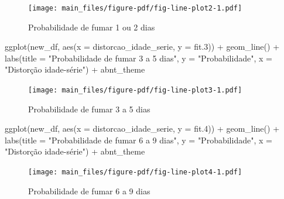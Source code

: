 \documentclass[
]{article}
\newenvironment{Shaded}{\begin{snugshade}}{\end{snugshade}}
\newcommand{\AttributeTok}[1]{\textcolor[rgb]{0.40,0.45,0.13}{#1}}
\newcommand{\FloatTok}[1]{\textcolor[rgb]{0.68,0.00,0.00}{#1}}
\newcommand{\FunctionTok}[1]{\textcolor[rgb]{0.28,0.35,0.67}{#1}}
\newcommand{\NormalTok}[1]{\textcolor[rgb]{0.00,0.23,0.31}{#1}}
\newcommand{\SpecialCharTok}[1]{\textcolor[rgb]{0.37,0.37,0.37}{#1}}
\newcommand{\StringTok}[1]{\textcolor[rgb]{0.13,0.47,0.30}{#1}}
\begin{document}
\begin{figure}[H]

{\centering \texttt{[image: main\_files/figure-pdf/fig-line-plot2-1.pdf]}

}

\caption{\label{fig-line-plot2}Probabilidade de fumar 1 ou 2 dias}

\end{figure}

\begin{Shaded}
\begin{Highlighting}[]
\FunctionTok{ggplot}\NormalTok{(new\_df, }\FunctionTok{aes}\NormalTok{(}\AttributeTok{x =}\NormalTok{ distorcao\_idade\_serie, }\AttributeTok{y =}\NormalTok{ fit}\FloatTok{.3}\NormalTok{)) }\SpecialCharTok{+} \FunctionTok{geom\_line}\NormalTok{() }\SpecialCharTok{+} \FunctionTok{labs}\NormalTok{(}\AttributeTok{title =} \StringTok{"Probabilidade de fumar 3 a 5 dias"}\NormalTok{, }\AttributeTok{y =} \StringTok{"Probabilidade"}\NormalTok{, }\AttributeTok{x =} \StringTok{"Distorção idade{-}série"}\NormalTok{) }\SpecialCharTok{+}\NormalTok{ abnt\_theme}
\end{Highlighting}
\end{Shaded}

\begin{figure}[H]

{\centering \texttt{[image: main\_files/figure-pdf/fig-line-plot3-1.pdf]}

}

\caption{\label{fig-line-plot3}Probabilidade de fumar 3 a 5 dias}

\end{figure}

\begin{Shaded}
\begin{Highlighting}[]
\FunctionTok{ggplot}\NormalTok{(new\_df, }\FunctionTok{aes}\NormalTok{(}\AttributeTok{x =}\NormalTok{ distorcao\_idade\_serie, }\AttributeTok{y =}\NormalTok{ fit}\FloatTok{.4}\NormalTok{)) }\SpecialCharTok{+} \FunctionTok{geom\_line}\NormalTok{() }\SpecialCharTok{+} \FunctionTok{labs}\NormalTok{(}\AttributeTok{title =} \StringTok{"Probabilidade de fumar 6 a 9 dias"}\NormalTok{, }\AttributeTok{y =} \StringTok{"Probabilidade"}\NormalTok{, }\AttributeTok{x =} \StringTok{"Distorção idade{-}série"}\NormalTok{) }\SpecialCharTok{+}\NormalTok{ abnt\_theme}
\end{Highlighting}
\end{Shaded}

\begin{figure}[H]

{\centering \texttt{[image: main\_files/figure-pdf/fig-line-plot4-1.pdf]}

}

\caption{\label{fig-line-plot4}Probabilidade de fumar 6 a 9 dias}

\end{figure}
\end{document}
